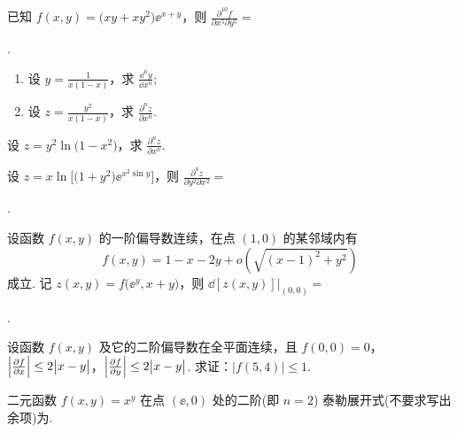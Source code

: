 	\begin{ti}
		已知 $f(x,y) = \bigl( xy + xy^{2} \bigr) \ee^{x + y}$，则 $\frac{\partial^{10}f}{\partial x^{5} \partial y^{5}} = $\htwo

		\noindent\htwo.
	\end{ti}

	\begin{ti}
		\begin{enumerate}
			\item 设 $y = \frac{1}{x(1 - x)}$，求 $\frac{\dd^{n}y}{\dd{x^{n}}}$;
			\item 设 $z = \frac{y^{2}}{x(1 - x)}$，求 $\frac{\partial^{n}z}{\partial x^{n}}$.
		\end{enumerate}
	\end{ti}

	\begin{ti}
		设 $z = y^{2} \ln \bigl( 1 - x^{2} \bigr)$，求 $\frac{\partial^{n}z}{\partial x^{n}}$.
	\end{ti}

	\begin{ti}
		设 $z = x \ln \bigl[ \bigl( 1 + y^{2} \bigr) \ee^{x^{2} \sin y} \bigr]$，则 $\frac{\partial^{4}z}{\partial y^{2} \partial x^{2}} = $\htwo

		\noindent\htwo.
	\end{ti}

	\begin{ti}
		设函数 $f(x,y)$ 的一阶偏导数连续，在点 $(1,0)$ 的某邻域内有
		\[
			f(x,y) = 1 - x - 2y + o\left( \sqrt{(x - 1)^{2} + y^{2}} \right)
		\]
		成立. 记 $z(x,y) = f\bigl( \ee^{y}, x + y \bigr)$，则 $\dd{[z(x,y)]}|_{(0,0)} = $\htwo

		\noindent\htwo.
	\end{ti}

	\begin{ti}
		设函数 $f(x,y)$ 及它的二阶偏导数在全平面连续，且 $f(0,0) = 0$，$\Bigl| \frac{\partial f}{\partial x} \Bigr| \leq 2 \bigl|x - y\bigr|$，$\Bigl| \frac{\partial f}{\partial y} \Bigr| \leq 2 \bigl|x - y\bigr|$. 求证：$\bigl|f(5,4)\bigr| \leq 1$.
	\end{ti}

	\begin{ti}
		二元函数 $f(x,y) = x^{y}$ 在点 $(\ee,0)$ 处的二阶(即 $n = 2$) 泰勒展开式(不要求写出余项)为\htwo.
	\end{ti}